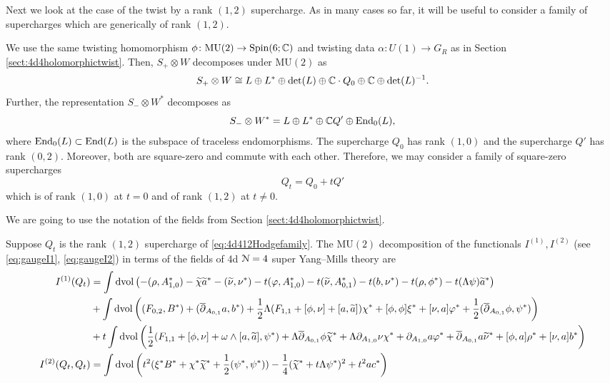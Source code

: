 \documentclass[10pt, oneside]{article}
\newcommand{\MU}{\mathrm{MU}}
\begin{document}
Next we look at the case of the twist by a rank $(1,2)$ supercharge. 
As in many cases so far, it will be useful to consider a family of supercharges which are generically of rank $(1,2)$. 

We use the same twisting homomorphism $\phi\colon \MU(2) \to \Spin(6;\CC)$ and twisting data $\alpha\colon U(1) \to G_R$ as in Section \ref{sect:4d4holomorphictwist}.
Then, $S_+ \otimes W$ decomposes under $\MU(2)$ as
\[
S_+\otimes W\cong L\oplus L^*\oplus \det(L)\oplus \mathbb C \cdot Q_0 \oplus \mathbb C \oplus \det(L)^{-1}.
\]
Further, the representation $S_- \otimes W^*$ decomposes as
\[
S_- \otimes W^* = L \oplus L^* \oplus \mathbb C Q'\oplus\operatorname{End}_0(L),
\]
where $\operatorname{End}_0(L)\subset \operatorname{End}(L)$ is the subspace of traceless endomorphisms. The supercharge $Q_0$ has rank $(1, 0)$ and the supercharge $Q'$ has rank $(0, 2)$. Moreover, both are square-zero and commute with each other. Therefore, we may consider a family of square-zero supercharges
\begin{equation}
Q_t = Q_0 + tQ'
\label{eq:4d412Hodgefamily}
\end{equation}
which is of rank $(1, 0)$ at $t=0$ and of rank $(1, 2)$ at $t\neq 0$.

We are going to use the notation of the fields from Section \ref{sect:4d4holomorphictwist}.

\begin{prop}
Suppose $Q_t$ is the rank $(1,2)$ supercharge of \eqref{eq:4d412Hodgefamily}. The $\MU(2)$ decomposition of the functionals $I^{(1)}, I^{(2)}$ (see \eqref{eq:gaugeI1}, \eqref{eq:gaugeI2}) in terms of the fields of 4d $\mathcal N=4$ super Yang--Mills theory are
\begin{align*}
I^{(1)}(Q_t) &= \int \operatorname{dvol}\left(-(\rho, A_{1, 0}^*) - \widetilde{\chi}\widetilde{a}^* - (\widetilde{\nu}, \nu^*) - t(\varphi, A_{1, 0}^*) - t(\widetilde{\nu}, A_{0, 1}^*) - t(b, \nu^*) - t(\rho, \phi^*) - t(\Lambda\psi)\widetilde{a}^*\right) \\
&+ \int\operatorname{dvol}\left((F_{0, 2}, B^*) + (\overline{\partial}_{A_{0, 1}}a, b^*) + \frac{1}{2}\Lambda(F_{1, 1} + [\phi, \nu] + [a, \widetilde{a}])\chi^* + [\phi, \phi]\xi^* + [\nu, a]\varphi^* + \frac{1}{2} (\overline{\partial}_{A_{0,1}} \phi, \psi^*)\right) \\
&+t\int\operatorname{dvol}\left(\frac{1}{2} (F_{1, 1} + [\phi, \nu] + \omega\wedge [a, \widetilde{a}], \psi^*) + \Lambda \overline{\partial}_{A_{0, 1}} \phi \widetilde{\chi}^* + \Lambda \partial_{A_{1, 0}}\nu \chi^* + \partial_{A_{1, 0}} a \varphi^* + \overline{\partial}_{A_{0, 1}} a \widetilde{\nu}^* + [\phi, a]\rho^* + [\nu, a]b^*\right) \\
I^{(2)} (Q_t, Q_t) &= \int \operatorname{dvol} \left(t^2(\xi^*B^* + \chi^*\widetilde{\chi}^* + \frac{1}{2}(\psi^*, \psi^*)) -\frac{1}{4}(\widetilde{\chi}^* + t \Lambda\psi^*)^2 + t^2 ac^*\right) \\
\end{align*}
\end{prop}
\end{document}

